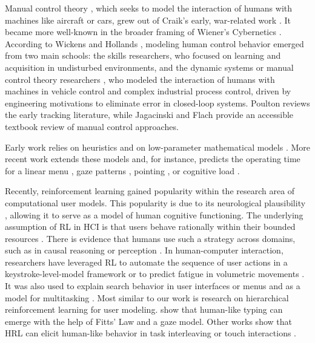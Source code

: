 Manual control theory \cite{McRuer1967, Costello1968}, which seeks to model the interaction of humans with machines like aircraft or cars, grew out of Craik's early, war-related work \cite{Craik1947}. It became more well-known in the broader framing of Wiener's Cybernetics \cite{Wiener1948}. According to Wickens and Hollands \cite{Wickens1999}, modeling human control behavior emerged from two main schools: the skills researchers, who focused on learning and acquisition in undisturbed environments, and the dynamic systems or manual control theory researchers \cite{Kelley1968, Sheridan1974}, who modeled the interaction of humans with machines in vehicle control and complex industrial process control, driven by engineering motivations to eliminate error in closed-loop systems. Poulton \cite{Poulton1974} reviews the early tracking literature, while Jagacinski and Flach \cite{Jagacinski2003} provide an accessible textbook review of manual control approaches.

Early work relies on heuristics \cite{card1986model, card1980klm, card1983the, kieras1997overview, anderson1997act} and on low-parameter mathematical models \cite{fitts1954information, hick1952rate}. More recent work extends these models and, for instance, predicts the operating time for a linear menu \cite{10.1145/1240624.1240723}, gaze patterns \cite{salvucci2001integrated}, pointing \cite{muller2017control, martin2021intermittent, murray2021forward, ikkala2022breathing}, or cognitive load \cite{duchowski2018index}.

Recently, reinforcement learning gained popularity within the research area of computational user models. This popularity is due to its neurological plausibility \cite{botvinick2012hierarchical, frank2012mechanisms}, allowing it to serve as a model of human cognitive functioning. The underlying assumption of RL in HCI is that users behave rationally within their bounded resources \cite{gershman2015computational, oulasvirta2022computational}. There is evidence that humans use such a strategy across domains, such as in causal reasoning \cite{denison2013rational} or perception \cite{gershman2012multistability}. In human-computer interaction, researchers have leveraged RL to automate the sequence of user actions in a keystroke-level-model framework \cite{leino2019computer} or to predict fatigue in volumetric movements \cite{cheema2020predicting}. It was also used to explain search behavior in user interfaces \cite{yang2020predicting} or menus \cite{chen2015emergence} and as a model for multitasking \cite{jokinen2021multitasking}. Most similar to our work is research on hierarchical reinforcement learning for user modeling. \citeauthor{jokinen2021touchscreen} \cite{jokinen2021touchscreen} show that human-like typing can emerge with the help of Fitts' Law and a gaze model. Other works show that HRL can elicit human-like behavior in task interleaving \cite{gebhardt2020hierarchical} or touch interactions \cite{jokinen2021touchscreen}.

